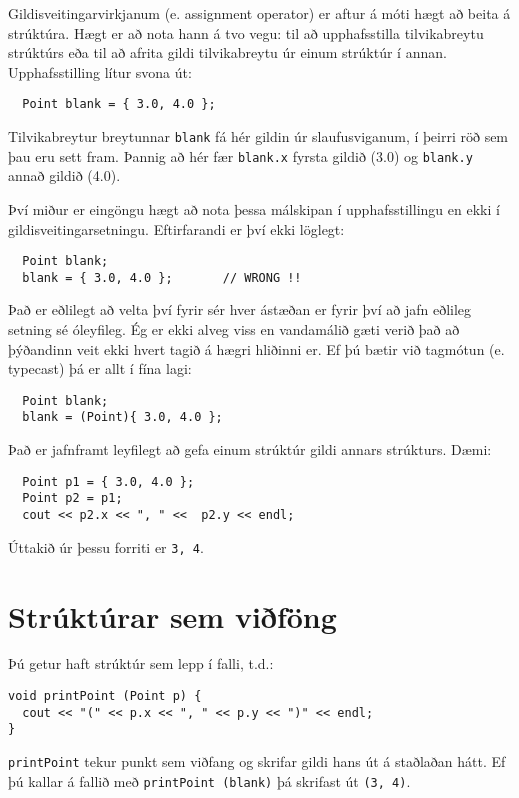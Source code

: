Gildisveitingarvirkjanum (e. assignment operator) er aftur á móti hægt að beita á strúktúra.
Hægt er að nota hann á tvo vegu: til að upphafsstilla tilvikabreytu strúktúrs eða til að afrita gildi tilvikabreytu úr einum strúktúr í annan.
Upphafsstilling lítur svona út:

\begin{verbatim}
  Point blank = { 3.0, 4.0 };
\end{verbatim}
%
Tilvikabreytur breytunnar {\tt blank} fá hér gildin úr slaufusviganum, í þeirri röð sem þau eru sett fram.
Þannig að hér fær {\tt blank.x} fyrsta gildið (3.0) og {\tt blank.y} annað gildið (4.0). 

Því miður er eingöngu hægt að nota þessa málskipan í upphafsstillingu en ekki í gildisveitingarsetningu.
Eftirfarandi er því ekki löglegt:

\begin{verbatim}
  Point blank;
  blank = { 3.0, 4.0 };       // WRONG !!
\end{verbatim}
%
Það er eðlilegt að velta því fyrir sér hver ástæðan er fyrir því að jafn eðlileg setning sé óleyfileg.
Ég er ekki alveg viss en vandamálið gæti verið það að þýðandinn veit ekki hvert tagið á hægri hliðinni er.
Ef þú bætir við tagmótun (e. typecast) þá er allt í fína lagi:

\begin{verbatim}
  Point blank;
  blank = (Point){ 3.0, 4.0 };
\end{verbatim}
%

Það er jafnframt leyfilegt að gefa einum strúktúr gildi annars strúkturs. Dæmi: 

\begin{verbatim}
  Point p1 = { 3.0, 4.0 };
  Point p2 = p1;
  cout << p2.x << ", " <<  p2.y << endl;
\end{verbatim}
%
Úttakið úr þessu forriti er {\tt 3, 4}.

\section{Strúktúrar sem viðföng}

Þú getur haft strúktúr sem lepp í falli, t.d.:

\begin{verbatim}
void printPoint (Point p) {
  cout << "(" << p.x << ", " << p.y << ")" << endl;
}
\end{verbatim}
%
{\tt printPoint} tekur punkt sem viðfang og skrifar gildi hans út á staðlaðan hátt.
Ef þú kallar á fallið með {\tt printPoint (blank)} þá skrifast út {\tt (3, 4)}.

